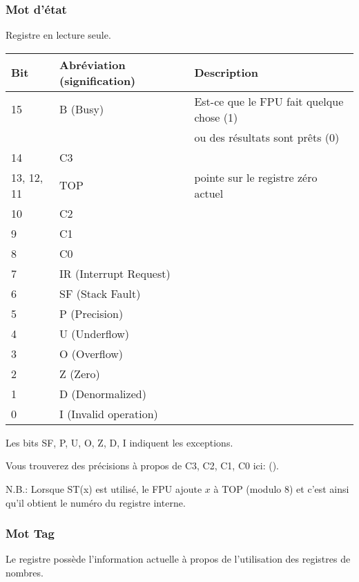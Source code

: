\subsubsection{Mot d'état}

\label{FPU_status_word}
Registre en lecture seule.

\small
\begin{center}
\begin{tabular}{ | l | l | l | }
\hline
Bit &
Abréviation (signification) &
Description \\
\hline
15   & B (Busy) & Est-ce que le FPU fait quelque chose (1)\\
     &          & ou des résultats sont prêts (0) \\
\hline
14   & C3 & \\
\hline
13, 12, 11 & TOP & pointe sur le registre zéro actuel \\
\hline
10 & C2 & \\
\hline
9  & C1 & \\
\hline
8  & C0 & \\
\hline
7  & IR (Interrupt Request) & \\
\hline
6  & SF (Stack Fault) & \\
\hline
5  & P (Precision) & \\
\hline
4  & U (Underflow) & \\
\hline
3  & O (Overflow) & \\
\hline
2  & Z (Zero) & \\
\hline
1  & D (Denormalized) & \\
\hline
0  & I (Invalid operation) & \\
\hline
\end{tabular}
\end{center}
\normalsize

Les bits SF, P, U, O, Z, D, I indiquent les exceptions.

Vous trouverez des précisions à propos de C3, C2, C1, C0 ici: ().

N.B.: Lorsque ST(x) est utilisé, le FPU ajoute $x$ à TOP (modulo 8) et c'est ainsi
qu'il obtient le numéro du registre interne.

\subsubsection{Mot Tag}

Le registre possède l'information actuelle à propos de l'utilisation des registres
de nombres.

